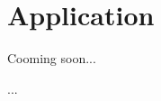 \documentclass[a4paper, 10pt]{article}
\begin{document}
\subject[2110203 - Computer Engineering Mathematics II]


\section{Application}


\begin{problem}
    Cooming soon...
\end{problem}

\begin{solution}
...
\end{solution}
\end{document}
